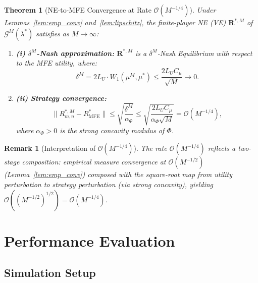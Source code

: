 \documentclass[journal]{IEEEtran}
\newtheorem{theorem}{Theorem}
\newtheorem{remark}{Remark}
\newcommand{\calG}{\mathcal{G}}
\newcommand{\bfR}{\mathbf{R}}
\newcommand{\WassDist}{W_{1}}
\begin{document}
\begin{theorem}[NE-to-MFE Convergence at Rate
$\mathcal{O}(M^{-1/4})$]
\label{thm:mfg}
Under Lemmas~\ref{lem:emp_conv} and~\ref{lem:lipschitz}, the finite-player NE (VE) $\bfR^{*,M}$ of $\calG^M(\lambda^*)$ satisfies as $M\to\infty$:

\begin{enumerate}
    \item \textbf{(i) $\delta^M$-Nash approximation:}
$\bfR^{*,M}$ is a $\delta^M$-Nash Equilibrium with respect to the MFE utility, where:
    \begin{equation}
        \delta^M
        = 2L_U\cdot
        \WassDist(\mu^M,\mu^*)
        \leq \frac{2L_U C_\mu}{\sqrt{M}}
        \to 0.
        \label{eq:delta_ne}
    \end{equation}

    \item \textbf{(ii) Strategy convergence:}
    \begin{equation}
        \|R_{m,n}^{*,M} - R_{\mathrm{MFE}}^*\|
        \leq
        \sqrt{\frac{\delta^M}{\alpha_\Phi}}
        \leq
        \sqrt{\frac{2L_U C_\mu}
        {\alpha_\Phi\sqrt{M}}}
        = \mathcal{O}(M^{-1/4}),
        \label{eq:mfe_rate}
    \end{equation}
where $\alpha_\Phi > 0$ is the strong concavity modulus of $\Phi$.
\end{enumerate}
\end{theorem}


\begin{remark}[Interpretation of $\mathcal{O}(M^{-1/4})$]
The rate $\mathcal{O}(M^{-1/4})$ reflects a two-stage composition: empirical measure convergence at $\mathcal{O}(M^{-1/2})$ (Lemma~\ref{lem:emp_conv}) composed with the square-root map from utility perturbation to strategy perturbation (via strong concavity), yielding $\mathcal{O}((M^{-1/2})^{1/2}) = \mathcal{O}(M^{-1/4})$.
\end{remark}

\section{Performance Evaluation}
\label{sec:simulation}

\subsection{Simulation Setup}
\end{document}
